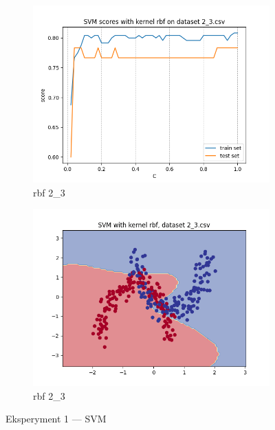 \documentclass[12pt]{article}
\newcommand*{\subfigwidth}{0.24\textwidth}
\begin{document}
\begin{figure}[H]
\begin{subfigure}[t]{\subfigwidth}
        \includegraphics[width=\linewidth]{img/exp_1/svm/2_3/rbf/scores.png}
        \caption{rbf 2\_3}
    \end{subfigure}
    \hfill
    \begin{subfigure}[t]{\subfigwidth}
        \includegraphics[width=\linewidth]{img/exp_1/svm/2_3/rbf/boundary.png}
        \caption{rbf 2\_3}
    \end{subfigure}
    \caption{Eksperyment 1 --- SVM}
\end{figure}

\clearpage
\end{document}
